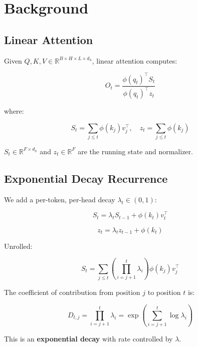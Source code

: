\section{Background}

\subsection{Linear Attention}

Given $Q, K, V \in \mathbb{R}^{B \times H \times L \times d_h}$, linear 
attention computes:

\begin{equation}
O_t = \frac{\phi(q_t)^\top S_t}{\phi(q_t)^\top z_t}
\end{equation}

where:

\begin{equation}
S_t = \sum_{j \leq t} \phi(k_j) v_j^\top, \quad
z_t = \sum_{j \leq t} \phi(k_j)
\end{equation}

$S_t \in \mathbb{R}^{F \times d_h}$ and $z_t \in \mathbb{R}^F$ are the 
running state and normalizer.

\subsection{Exponential Decay Recurrence}

We add a per-token, per-head decay $\lambda_t \in (0, 1)$:

\begin{equation}
S_t = \lambda_t S_{t-1} + \phi(k_t) v_t^\top
\end{equation}

\begin{equation}
z_t = \lambda_t z_{t-1} + \phi(k_t)
\end{equation}

Unrolled:

\begin{equation}
S_t = \sum_{j \leq t} \left( \prod_{i=j+1}^{t} \lambda_i \right) \phi(k_j) v_j^\top
\end{equation}

The coefficient of contribution from position $j$ to position $t$ is:

\begin{equation}
D_{t, j} = \prod_{i=j+1}^{t} \lambda_i = \exp\!\left(\sum_{i=j+1}^{t} \log \lambda_i\right)
\end{equation}

This is an \textbf{exponential decay} with rate controlled by $\lambda$.


